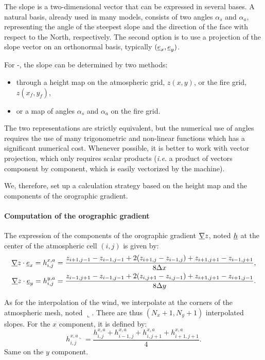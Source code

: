 \medskip

The slope is a two-dimensional vector that can be expressed in several bases. A natural basis, already used in many models, consists of two angles $\alpha_s$ and $\alpha_a$, representing the angle of the steepest slope and the direction of the face with respect to the North, respectively.
The second option is to use a projection of the slope vector on an orthonormal basis, typically $(\underline{e}_x, \underline{e}_y)$.

\medskip

For \MNH-\Blaze, the slope can be determined by two methods:
\begin{itemize}
  \item through a height map on the atmospheric grid, $z(x,y)$, or the fire grid, $z(x_f,y_f)$,
  \item or a map of angles $\alpha_s$ and $\alpha_a$ on the fire grid.
\end{itemize}
The two representations are strictly equivalent, but the numerical use of angles requires the use of many trigonometric and non-linear functions which has a significant numerical cost.
Whenever possible, it is better to work with vector projection, which only requires scalar products (\textit{i.e.} a product of vectors component by component, which is easily vectorized by the machine).

We, therefore, set up a calculation strategy based on the height map and the components of the orographic gradient. 

\paragraph{Computation of the orographic gradient}
The expression of the components of the orographic gradient $\underline{\nabla} z$, noted $\underline{h}$ at the center of the atmospheric cell $(i,j)$ is given by:
\begin{equation}
  \begin{split}
  	\underline{\nabla} z \cdot \underline{e}_x = h_{i,j}^{x,a} &= \frac{ z_{i+1,j-1} - z_{i-1,j-1} + 2 (z_{i+1,j}-z_{i-1,j}) + z_{i+1,j+1} - z_{i-1,j+1}}{8 \Delta x}, \\
  	\underline{\nabla} z \cdot \underline{e}_y = h_{i,j}^{y,a} &= \frac{z_{i-1,j+1} -z_{i-1,j-1} + 2 (z_{i,j+1}-z_{i,j-1}) + z_{i+1,j+1} - z_{i+1,j-1}}{8 \Delta y}. \\
  \end{split}
\end{equation}

As for the interpolation of the wind, we interpolate at the corners of the atmospheric mesh, noted $\llcorner$. There are thus $(N_x +1, N_y+1)$ interpolated slopes. For the $x$ component, it is defined by:
\begin{equation}
  h_{i,j}^{x,a\llcorner} = \frac{h_{i,j}^{x,a} + h_{i-1,j}^{x,a} + h_{i,j+1}^{x,a} + h_{i+1,j+1}^{x,a}}{4}.
\end{equation}
Same on the $y$ component.

